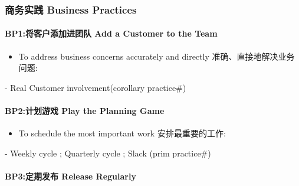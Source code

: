 \hypertarget{ux5546ux52a1ux5b9eux8df5-business-practices}{%
\subsubsection{商务实践 Business
Practices}\label{ux5546ux52a1ux5b9eux8df5-business-practices}}

\hypertarget{bp1ux5c06ux5ba2ux6237ux6dfbux52a0ux8fdbux56e2ux961f-add-a-customer-to-the-team}{%
\paragraph{BP1:将客户添加进团队 Add a Customer to the
Team}\label{bp1ux5c06ux5ba2ux6237ux6dfbux52a0ux8fdbux56e2ux961f-add-a-customer-to-the-team}}

\begin{itemize}
\tightlist
\item
  To address business concerns accurately and directly
  准确、直接地解决业务问题:
\end{itemize}

\begin{description}
\tightlist
\item[]
- Real Customer involvement(corollary practice\#)
\end{description}

\hypertarget{bp2ux8ba1ux5212ux6e38ux620f-play-the-planning-game}{%
\paragraph{BP2:计划游戏 Play the Planning
Game}\label{bp2ux8ba1ux5212ux6e38ux620f-play-the-planning-game}}

\begin{itemize}
\tightlist
\item
  To schedule the most important work 安排最重要的工作:\\
\end{itemize}

\begin{description}
\tightlist
\item[]
- Weekly cycle ; Quarterly cycle ; Slack (prim practice\#)
\end{description}

\hypertarget{bp3ux5b9aux671fux53d1ux5e03-release-regularly}{%
\paragraph{BP3:定期发布 Release
Regularly}\label{bp3ux5b9aux671fux53d1ux5e03-release-regularly}}

